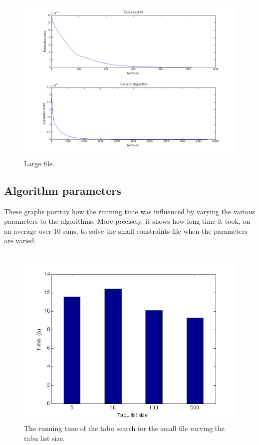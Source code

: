 \documentclass[titlepage,a4paper]{article}
\begin{document}
\begin{figure}[H]
  \centerline{\includegraphics[scale=0.5]{../results/figures/plot_medium.png}}
  \caption{Large file.}
  \label{plot_large}
\end{figure}

\pagebreak
\subsection{Algorithm parameters}
These graphs portray how the running time was influenced by varying the various parameters to the algorithms. More precisely, it shows how long time it took, on an average over 10 runs, to solve the small constraints file when the parameters are varied. \\\\
\begin{figure}[H]
  \begin{center}
    \includegraphics[scale=0.5]{../results/figures/tabu_list_size.png}
  \end{center}
  \caption{The running time of the tabu search for the small file varying the tabu list size.}
  \label{tabu_list_size}
\end{figure}
\end{document}
